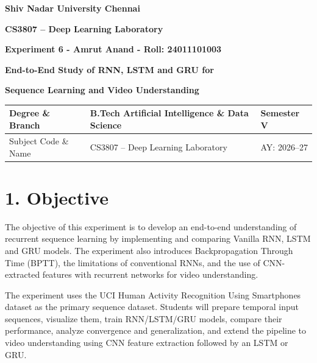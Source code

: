\documentclass[10pt]{article}
\begin{document}

\begin{center}

{\large\textbf{Shiv Nadar University Chennai}}

\vspace{2mm}

{\normalsize\textbf{CS3807 -- Deep Learning Laboratory}}

\vspace{2mm}

{\large\textbf{Experiment 6 - Amrut Anand - Roll: 24011101003}}

\vspace{1mm}

{\normalsize\textbf{End-to-End Study of RNN, LSTM and GRU for}}

{\normalsize\textbf{Sequence Learning and Video Understanding}}

\end{center}

\vspace{3mm}

\begin{tabular}{|p{3.4cm}|p{9.0cm}|p{1.4cm}|}
\hline
Degree \& Branch &
B.Tech Artificial Intelligence \& Data Science &
Semester V\\
\hline
Subject Code \& Name &
CS3807 -- Deep Learning Laboratory &
AY: 2026--27\\
\hline
\end{tabular}


\section*{1. Objective}

The objective of this experiment is to develop an end-to-end understanding of
recurrent sequence learning by implementing and comparing Vanilla RNN, LSTM
and GRU models. The experiment also introduces Backpropagation Through Time
(BPTT), the limitations of conventional RNNs, and the use of CNN-extracted
features with recurrent networks for video understanding.

The experiment uses the UCI Human Activity Recognition Using Smartphones
dataset as the primary sequence dataset. Students will prepare temporal input
sequences, visualize them, train RNN/LSTM/GRU models, compare their
performance, analyze convergence and generalization, and extend the pipeline
to video understanding using CNN feature extraction followed by an LSTM or
GRU.
\end{document}
